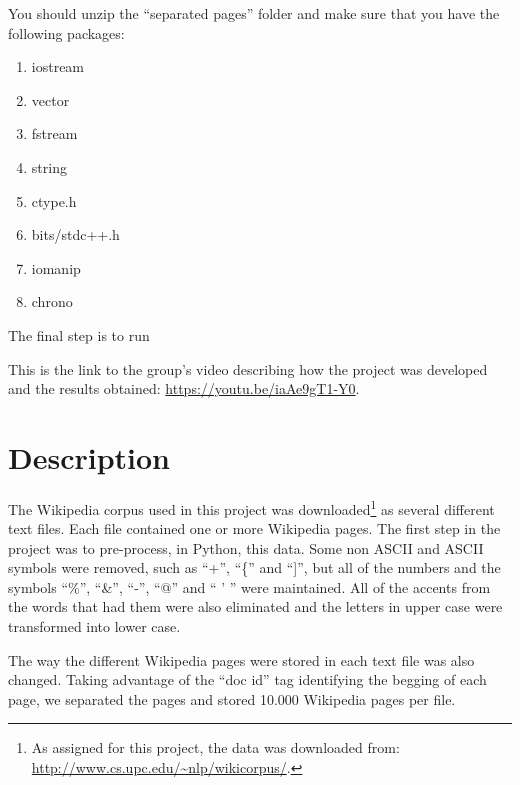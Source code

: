 \documentclass{article}
\begin{document}
You should unzip the ``separated pages'' folder and make sure that you have the following packages:
\begin{enumerate}
\item iostream
\item vector
\item fstream
\item string
\item ctype.h
\item bits/stdc++.h
\item iomanip
\item chrono
 \end{enumerate}

The final step is to run 

This is the link to the group's video describing how the project was developed and the results obtained: \url{https://youtu.be/iaAe9gT1-Y0}. 

\section*{Description}
The Wikipedia corpus used in this project was downloaded\footnote{As assigned for this project, the data was downloaded from: \url{http://www.cs.upc.edu/~nlp/wikicorpus/}.}  as several different text files. Each file contained one or more Wikipedia pages. The first step in the project was to pre-process, in Python, this data. Some non ASCII and ASCII symbols were removed, such as ``+'', ``\{'' and ``]'', but all of the numbers and the symbols ``\%'', ``\&'', ``-'', ``@'' and `` ' '' were maintained. All of the accents from the words that had them were also eliminated and the letters in upper case were transformed into lower case. 

The way the different Wikipedia pages were stored in each text file was also changed. Taking advantage of the ``doc id'' tag identifying the begging of each page, we separated the pages and stored 10.000 Wikipedia pages per file. 
\end{document}
